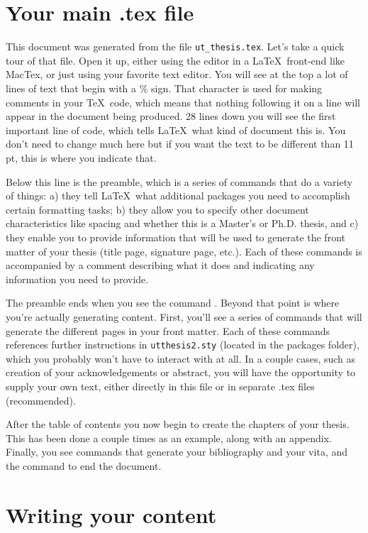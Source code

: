 \section{Your main .tex file}

This document was generated from the file {\tt ut\_thesis.tex}. 
Let's take a quick tour of that file.
Open it up, either using the editor in
a \LaTeX ~front-end like MacTex, or just using your
favorite text editor. You will see at the top a lot of lines of text that begin
with a \% sign. That character is used for making comments in your \TeX ~code,
which means that nothing following it on a line will appear in the document
being produced. 28 lines down you will see the first important line of code,
which tells \LaTeX ~what kind of document this is. You don't need to change much
here but if you want the text to be different than 11 pt, this is where you
indicate that.

Below this line is the preamble, which is a series of commands that do a
variety of things: a) they tell \LaTeX ~what additional packages you need to
accomplish certain formatting tasks; b) they allow you to specify other
document characteristics like spacing and whether this is a Master's or 
Ph.D. thesis, and c) they enable you to provide information that will be used
to generate the front matter of your thesis (title page, signature page, etc.).
Each of these commands is accompanied by a comment describing what it does and
indicating any information you need to provide.

The preamble ends when you see the command  \verb++. Beyond
that point is where you're actually generating content. First, you'll see
a series of commands that will generate the different pages in your front
matter. Each of these commands references further instructions in 
{\tt utthesis2.sty} (located in the packages folder), which you probably won't 
have to interact with at all. In a couple cases, such as creation of your
acknowledgements or abstract, you will have the opportunity to supply your own
text, either directly in this file or in separate .tex files (recommended).

After the table of contents you now begin to create the chapters of your thesis.
This has been done a couple times as an example, along with an appendix.
Finally, you see commands that generate your bibliography and your vita, and
the command to end the document.

\section{Writing your content}
\label{sec:content}

